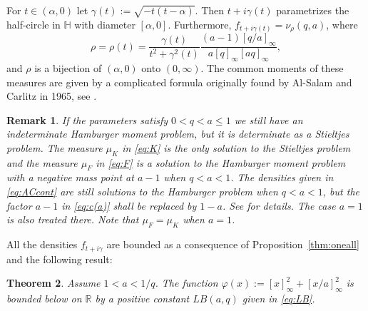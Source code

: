 \documentclass [12pt]{article}
\newtheorem{thm}{Theorem}[section]
\newtheorem{rem}[thm]{Remark}
\newcommand{\R}{\mathbb{R}}
\renewcommand{\H}{\mathbb{H}}
\begin{document}
For $t\in (\alpha,0)$ let $\gamma(t):=\sqrt{-t(t-\alpha)}$. Then $t+i\gamma(t)$ parametrizes the half-circle in $\H$ with diameter $[\alpha,0]$. Furthermore, $f_{t+i\gamma(t)}=\nu_{\rho}(q,a)$,
where
$$
\rho=\rho(t)=\frac{\gamma(t)}{t^2+\gamma^2(t)}\frac{(a-1)[q/a]_\infty}{a [q]_\infty [aq]_\infty},
$$
and $\rho$ is a bijection of $(\alpha,0)$ onto $(0,\infty)$.
The common moments of these measures are given by a complicated formula originally found by Al-Salam and Carlitz in 1965, see \cite[Section 4.9]{B:V}.

\begin{rem}{\rm If the parameters satisfy $0<q<a\le 1$ we still have an indeterminate Hamburger moment problem, but it is determinate as a Stieltjes problem. The measure $\mu_K$ in \eqref{eq:K} is the only solution to the Stieltjes problem and the measure $\mu_F$ in \eqref{eq:F} is a solution to the Hamburger moment problem with a negative mass point at $a-1$ when $q<a<1$.  The densities given in \eqref{eq:ACcont} are still solutions to the Hamburger problem when $q<a<1$, but 
the factor $a-1$ in \eqref{eq:c(a)} shall be replaced by $1-a$. See \cite{B:V} for details. The case  $a=1$  is also treated there. Note that $\mu_F=\mu_K$ when $a=1$.}
\end{rem}

All the densities $f_{t+i\gamma}$ are bounded as a consequence of Proposition~\ref{thm:oneall} and the following result:

\begin{thm}\label{thm:bd} Assume $1<a<1/q$. The function $\varphi(x):=[x]_\infty^2+[x/a]_\infty^2$ is bounded below on $\R$ by a positive constant $LB(a,q)$  given in \eqref{eq:LB}.
\end{thm}
\end{document}
